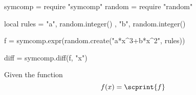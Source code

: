 \begin{luacode*}
  symcomp = require "symcomp"
  random = require "random"

  local rules = 
  {
    { "a", random.integer() },
    { "b", random.integer() }
  }
    
  f = symcomp.expr(random.create("a*x^3+b*x^2", rules))

  diff = symcomp.diff(f, "x")
\end{luacode*}

\question
Given the function
\begin{equation*}
    f(x)=\scprint{f}
\end{equation*}


\begin{solution}


\end{solution}